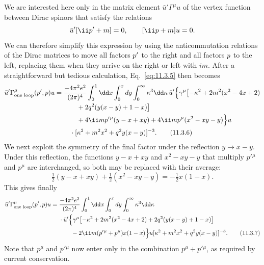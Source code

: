 We are interested here only in the matrix element
$\bar u'\Gamma^\mu u$ of the vertex function between Dirac spinors that
satisfy the relations
\[
\bar u'[\ii\sl{p}'+m]=0,\qquad [\ii\sl{p}+m]u=0.
\]
We can therefore simplify this expression by using the anticommutation
relations of the Dirac matrices to move all factors $\sl{p}'$ to the right and
all factors $\sl{p}$ to the left, replacing them when they arrive on the right
or left with $im$. After a straightforward but tedious calculation,
Eq.~\eqref{eq:11.3.5} then becomes
\begin{align}
\bar u'\Gamma^\mu_{\text{one loop}}(p',p)u={}&
 {-4\pi^2e^2\over(2\pi)^4}\int_0^1\dd x\int_0^xdy
 \int_0^\infty\kappa^3\dd\kappa\,
 \bar u'\Bigl\{\gamma^\mu\bigl[-\kappa^2+2m^2(x^2-4x+2)
\notag\\
&\qquad+2q^2(y(x-y)+1-x)\bigr]\notag\\
&\qquad+4\ii m p'{}^\mu(y-x+xy)+4\ii m p^\mu(x^2-xy-y)\Bigr\}u
\notag\\
&\quad\cdot[\kappa^2+m^2x^2+q^2y(x-y)]^{-3}.
\tag{11.3.6}\label{eq:11.3.6}
\end{align}
We next exploit the symmetry of the final factor under the reflection
$y\longrightarrow x-y$. Under this reflection, the functions $y-x+xy$ and
$x^2-xy-y$ that multiply $p'{}^\mu$ and $p^\mu$ are interchanged, so both
may be replaced with their average:
\[
\tfrac12(y-x+xy)+\tfrac12(x^2-xy-y)=-\tfrac12x(1-x).
\]
This gives finally
\begin{align}
\bar u'\Gamma^\mu_{\text{one loop}}(p',p)u={}&
 {-4\pi^2e^2\over(2\pi)^4}\int_0^1\dd x\int_0^xdy
 \int_0^\infty\kappa^3\dd\kappa\notag\\
&\cdot\bar u'\Bigl\{\gamma^\mu\bigl[-\kappa^2+2m^2(x^2-4x+2)
 +2q^2(y(x-y)+1-x)\bigr]\notag\\
&\qquad-2\ii m(p'{}^\mu+p^\mu)x(1-x)\Bigr\}u
 [\kappa^2+m^2x^2+q^2y(x-y)]^{-3}.
\tag{11.3.7}\label{eq:11.3.7}
\end{align}
Note that $p^\mu$ and $p'{}^\mu$ now enter only in the combination
$p^\mu+p'{}^\mu$, as required by current conservation.

